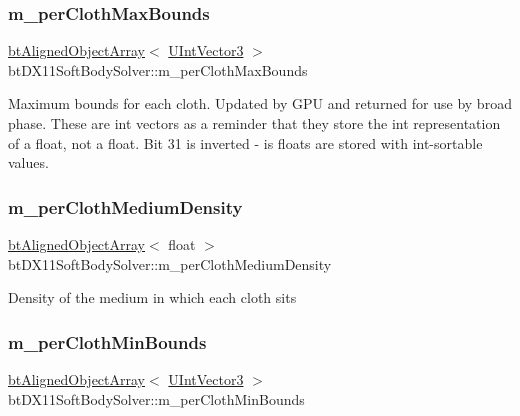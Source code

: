 \subsubsection{\texorpdfstring{m\+\_\+per\+Cloth\+Max\+Bounds}{m\_perClothMaxBounds}}
{\footnotesize\ttfamily \hyperlink{classbtAlignedObjectArray}{bt\+Aligned\+Object\+Array}$<$ \hyperlink{structbtDX11SoftBodySolver_1_1UIntVector3}{U\+Int\+Vector3} $>$ bt\+D\+X11\+Soft\+Body\+Solver\+::m\+\_\+per\+Cloth\+Max\+Bounds\hspace{0.3cm}{\ttfamily [protected]}}

Maximum bounds for each cloth. Updated by G\+PU and returned for use by broad phase. These are int vectors as a reminder that they store the int representation of a float, not a float. Bit 31 is inverted -\/ is floats are stored with int-\/sortable values. \mbox{\label{classbtDX11SoftBodySolver_aebb8e95bf8685fed06cd8a66185e066a}} 
\subsubsection{\texorpdfstring{m\+\_\+per\+Cloth\+Medium\+Density}{m\_perClothMediumDensity}}
{\footnotesize\ttfamily \hyperlink{classbtAlignedObjectArray}{bt\+Aligned\+Object\+Array}$<$ float $>$ bt\+D\+X11\+Soft\+Body\+Solver\+::m\+\_\+per\+Cloth\+Medium\+Density\hspace{0.3cm}{\ttfamily [protected]}}

Density of the medium in which each cloth sits \mbox{\label{classbtDX11SoftBodySolver_a33d4d4714b9f20c781d059aeaaf629db}} 
\subsubsection{\texorpdfstring{m\+\_\+per\+Cloth\+Min\+Bounds}{m\_perClothMinBounds}}
{\footnotesize\ttfamily \hyperlink{classbtAlignedObjectArray}{bt\+Aligned\+Object\+Array}$<$ \hyperlink{structbtDX11SoftBodySolver_1_1UIntVector3}{U\+Int\+Vector3} $>$ bt\+D\+X11\+Soft\+Body\+Solver\+::m\+\_\+per\+Cloth\+Min\+Bounds\hspace{0.3cm}{\ttfamily [protected]}}

